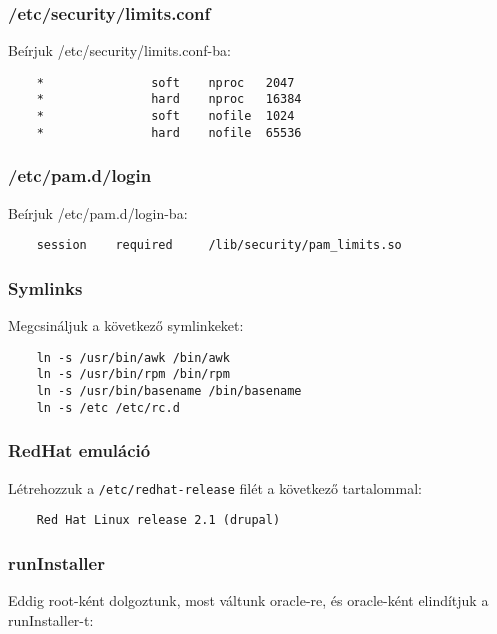 \subsubsection*{/etc/security/limits.conf}

Beírjuk /etc/security/limits.conf-ba:

\begin{verbatim}
    *               soft    nproc   2047
    *               hard    nproc   16384
    *               soft    nofile  1024
    *               hard    nofile  65536
\end{verbatim}


\subsubsection*{/etc/pam.d/login}

Beírjuk /etc/pam.d/login-ba:

\begin{verbatim}
    session    required     /lib/security/pam_limits.so
\end{verbatim}


\subsubsection*{Symlinks}

Megcsináljuk a következő symlinkeket:

\begin{verbatim}
    ln -s /usr/bin/awk /bin/awk
    ln -s /usr/bin/rpm /bin/rpm
    ln -s /usr/bin/basename /bin/basename
    ln -s /etc /etc/rc.d
\end{verbatim}


\subsubsection*{RedHat emuláció}

Létrehozzuk a \verb!/etc/redhat-release!
filét a következő tartalommal:

\begin{verbatim}
    Red Hat Linux release 2.1 (drupal)
\end{verbatim}


\subsubsection*{runInstaller}

Eddig root-ként dolgoztunk, most váltunk oracle-re,
és oracle-ként elindítjuk  a runInstaller-t:

